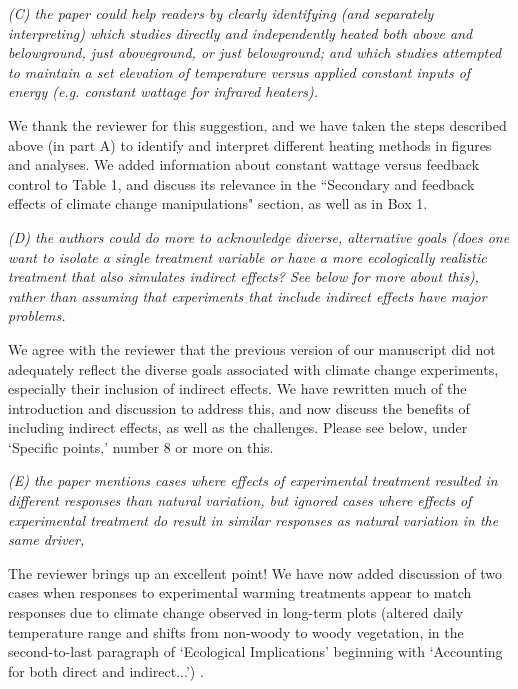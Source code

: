 \documentclass[11pt,a4paper]{letter}
\begin{document}
\par \emph{(C) the paper could help readers by clearly identifying (and separately interpreting) which studies directly and independently heated both above and belowground, just aboveground, or just belowground; and which studies attempted to maintain a set elevation of temperature versus applied constant inputs of energy (e.g. constant wattage for infrared heaters).}

\par We thank the reviewer for this suggestion, and we have taken the steps described above (in part A) to identify and interpret different heating methods in figures and analyses. We added information about constant wattage versus feedback control to Table 1, and discuss its relevance in the ``Secondary and feedback effects of climate change manipulations" section, as well as in Box 1. 

\par \emph{(D) the authors could do more to acknowledge diverse, alternative goals (does one want to isolate a single treatment variable or have a more ecologically realistic treatment that also simulates indirect effects? See below for more about this), rather than assuming that experiments that include indirect effects have major problems.}

\par We agree with the reviewer that the previous version of our manuscript did not adequately reflect the diverse goals associated with climate change experiments, especially their inclusion of indirect effects. We have rewritten much of the introduction and discussion to address this, and now discuss the benefits of including indirect effects, as well as the challenges. Please see below,  under `Specific points,' number 8 or more on this.


\par \emph{(E) the paper mentions cases where effects of experimental treatment resulted in different responses than natural variation, but ignored cases where effects of experimental treatment do result in similar responses as natural variation in the same driver,}

\par The reviewer brings up an excellent point! We have now added discussion of two cases when responses to experimental warming treatments appear to match responses due to climate change observed in long-term plots (altered daily temperature range and shifts from non-woody to woody vegetation, in the second-to-last paragraph of `Ecological Implications' beginning with `Accounting for both direct and indirect...') . 
\end{document}
